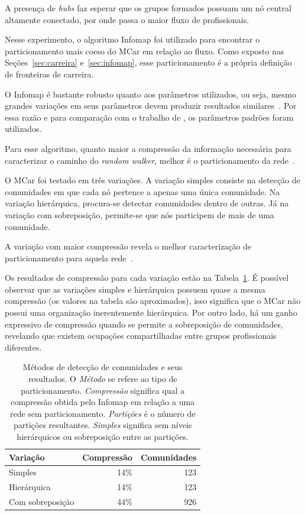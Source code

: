 \documentclass[
  article,
  11pt,
  a4paper,
  english,
  brazil,
  sumario=tradicional]{abntex2}
\begin{document}
A presença de \textit{hubs} faz esperar que os grupos formados possuam um nó central altamente conectado, por onde passa o maior fluxo de profissionais.


Nesse experimento, o algoritmo Infomap foi utilizado para encontrar o particionamento mais coeso do MCar em relação ao fluxo. Como exposto nas Seções~\ref{sec:carreira} e~\ref{sec:infomap}, esse particionamento é a própria definição de fronteiras de carreira.

O Infomap é bastante robusto quanto aos parâmetros utilizados, ou seja, mesmo grandes variações em seus parâmetros devem produzir resultados similares~\cite{Kawamoto2015-ha,Lambiotte2012-fp}. Por essa razão e para comparação com o trabalho de , os parâmetros padrões foram utilizados.

Para esse algoritmo, quanto maior a compressão da informação necessária para caracterizar o caminho do \textit{random walker}, melhor é o particionamento da rede~\cite{Rosvall2009-sd}.

O MCar foi testado em três variações. A variação simples consiste na detecção de comunidades em que cada nó pertence a apenas uma única comunidade. Na variação hierárquica, procura-se detectar comunidades dentro de outras. Já na variação com sobreposição, permite-se que nós participem de mais de uma comunidade.

A variação com maior compressão revela o melhor caracterização de particionamento para aquela rede~\cite{Viamontes_Esquivel2011-it,Rosvall2011-yi}.

Os resultados de compressão para cada variação estão na Tabela~\ref{tab:metodos}. É possível observar que as variações simples e hierárquica possuem quase a mesma compressão (os valores na tabela são aproximados), isso significa que o MCar não possui uma organização inerentemente hierárquica. Por outro lado, há um ganho expressivo de compressão quando se permite a sobreposição de comunidades, revelando que existem ocupações compartilhadas entre grupos profissionais diferentes.

\begin{table}
  \centering
  \begin{tabular}{@{} l r r @{}}
    \toprule
    Variação         & Compressão & Comunidades  \\
    \midrule
    Simples          & 14\%       & 123     \\
    Hierárquica      & 14\%       & 123     \\
    Com sobreposição & 44\%       & 926     \\
    \bottomrule
  \end{tabular}
  \caption{Métodos de detecção de comunidades e seus resultados. O \textit{Método} se refere ao tipo de particionamento. \textit{Compressão} significa qual a compressão obtida pelo Infomap em relação a uma rede sem particionamento. \textit{Partições} é o número de partições resultantes. \textit{Simples} significa sem níveis hierárquicos ou sobreposição entre as partições.}
  \label{tab:metodos}
\end{table}
\end{document}
